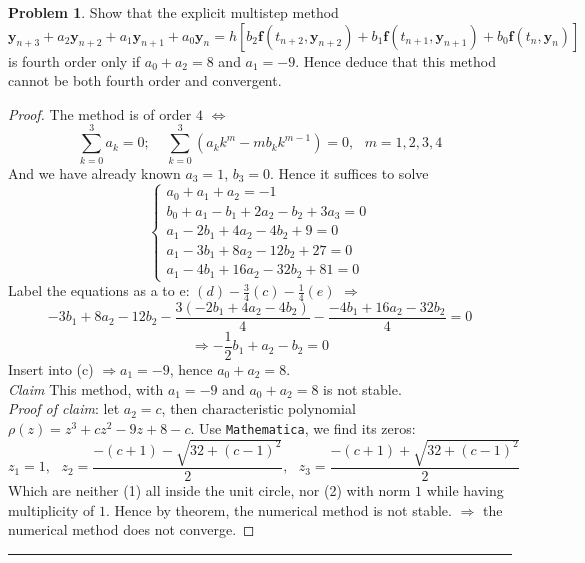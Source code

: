 \documentclass[a4paper, 10pt]{article}
\theoremstyle{definition}
\newtheorem{problem}{Problem}
\theoremstyle{hSol}
\begin{document}
\begin{problem} Show that the explicit multistep method 
$$
\bm{y}_{n+3} + a_2 \bm{y}_{n+2} + a_1 \bm{y}_{n+1} + a_0 \bm{y}_n = h[b_2 \bm{f}(t_{n+2}, \bm{y}_{n+2}) + b_1 \bm{f}(t_{n+1}, \bm{y}_{n+1}) + b_0 \bm{f}(t_{n}, \bm{y}_{n})]
$$
is fourth order only if $a_0 + a_2 =8$ and $a_1 = -9$. Hence deduce that this method cannot be both fourth order and convergent.
\end{problem}
\begin{proof} The method is of order $4$ $\iff$
\begin{equation}
  \sum_{k=0}^3 a_k = 0;~~~~~\sum_{k=0}^3(a_kk^m-mb_kk^{m-1})=0, ~~~m=1,2,3,4
\end{equation}
And we have already known $a_3=1$, $b_3=0$. Hence it suffices to solve
\begin{equation}
  \begin{cases}
  a_0 + a_1 + a_2 = -1 \\
  b_0 + a_1 - b_1 + 2a_2 - b_2 + 3a_3 = 0\\
  a_1 - 2b_1 + 4a_2 - 4b_2 + 9 = 0\\
  a_1 - 3b_1 + 8a_2 - 12b_2 + 27 = 0\\
  a_1 - 4b_1 + 16a_2 - 32b_2 + 81 =0
  \end{cases}
\end{equation}
Label the equations as a to e: $(d) - \frac{3}{4}(c) - \frac{1}{4}(e)$ $\Rightarrow$ 
$$
- 3b_1 + 8a_2 - 12b_2 - \frac{3(- 2b_1 + 4a_2 - 4b_2)}{4} - \frac{- 4b_1 + 16a_2 - 32b_2}{4} = 0 
$$
$$
\Rightarrow -\frac{1}{2}b_1 + a_2 - b_2 = 0
$$
Insert into (c) $\Rightarrow a_1 = -9$, hence $a_0+a_2 = 8$. \\
\emph{Claim} This method, with $a_1 = -9$ and $a_0+a_2 = 8$ is not stable. \\
\textit{Proof of claim}: let $a_2=c$, then characteristic polynomial $\rho(z)=z^3+cz^2-9z+8-c$. Use \texttt{Mathematica}, we find its zeros:
\begin{equation}
  z_1 = 1,~~~z_2 = \frac{-(c+1)-\sqrt{32+(c-1)^2}}{2},~~~z_3 = \frac{-(c+1)+\sqrt{32+(c-1)^2}}{2}
\end{equation}
Which are neither (1) all inside the unit circle, nor (2) with norm $1$ while having multiplicity of $1$. Hence by theorem, the numerical method is not stable. $\Rightarrow$ the numerical method does not converge.
\end{proof} 

\noindent\rule{16cm}{0.4pt}
\end{document}
